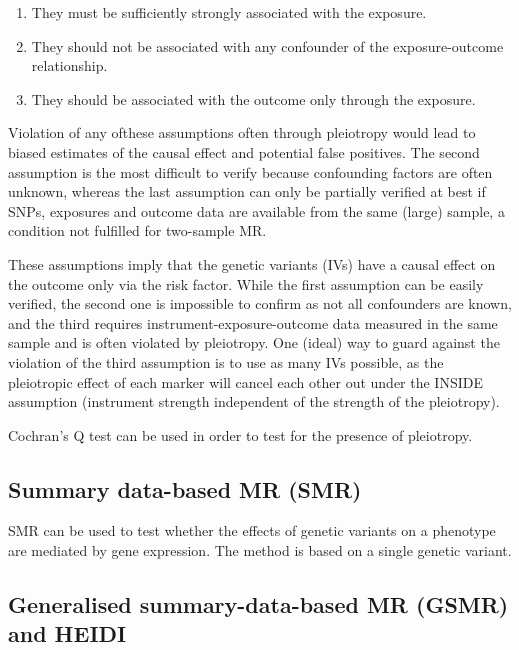 \documentclass[]{book}
\providecommand{\tightlist}{%
  \setlength{\itemsep}{0pt}\setlength{\parskip}{0pt}}
\theoremstyle{definition}
\theoremstyle{definition}
\theoremstyle{definition}
\theoremstyle{remark}
\begin{document}
\begin{enumerate}
\def\labelenumi{\arabic{enumi})}
\tightlist
\item
  They must be sufficiently strongly associated with the exposure.
\item
  They should not be associated with any confounder of the
  exposure-outcome relationship.
\item
  They should be associated with the outcome only through the exposure.
\end{enumerate}

Violation of any ofthese assumptions often through pleiotropy would lead
to biased estimates of the causal effect and potential false positives.
The second assumption is the most difficult to verify because
confounding factors are often unknown, whereas the last assumption can
only be partially verified at best if SNPs, exposures and outcome data
are available from the same (large) sample, a condition not fulfilled
for two-sample MR.

These assumptions imply that the genetic variants (IVs) have a causal
effect on the outcome only via the risk factor. While the first
assumption can be easily verified, the second one is impossible to
confirm as not all confounders are known, and the third requires
instrument-exposure-outcome data measured in the same sample and is
often violated by pleiotropy. One (ideal) way to guard against the
violation of the third assumption is to use as many IVs possible, as the
pleiotropic effect of each marker will cancel each other out under the
INSIDE assumption (instrument strength independent of the strength of
the pleiotropy).

Cochran's Q test can be used in order to test for the presence of
pleiotropy.

\subsection{Summary data-based MR
(SMR)}\label{summary-data-based-mr-smr}

SMR can be used to test whether the effects of genetic variants on a
phenotype are mediated by gene expression. The method is based on a
single genetic variant.

\subsection{Generalised summary-data-based MR (GSMR) and
HEIDI}\label{generalised-summary-data-based-mr-gsmr-and-heidi}
\end{document}
